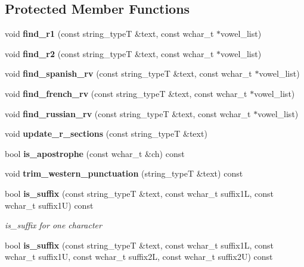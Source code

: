 \subsection*{Protected Member Functions}
\begin{DoxyCompactItemize}
\item 
void {\bfseries find\+\_\+r1} (const string\+\_\+typeT \&text, const wchar\+\_\+t $\ast$vowel\+\_\+list)\label{classstemming_1_1stem_a364b7a76f683d5244715638069a4fa93}

\item 
void {\bfseries find\+\_\+r2} (const string\+\_\+typeT \&text, const wchar\+\_\+t $\ast$vowel\+\_\+list)\label{classstemming_1_1stem_ab381c0d6a6291c2c21515e9398e83085}

\item 
void {\bfseries find\+\_\+spanish\+\_\+rv} (const string\+\_\+typeT \&text, const wchar\+\_\+t $\ast$vowel\+\_\+list)\label{classstemming_1_1stem_ae6cb258098ba91462d421977b1eed8e7}

\item 
void {\bfseries find\+\_\+french\+\_\+rv} (const string\+\_\+typeT \&text, const wchar\+\_\+t $\ast$vowel\+\_\+list)\label{classstemming_1_1stem_a9626e49b982eda0d8ec3bb861d864b42}

\item 
void {\bfseries find\+\_\+russian\+\_\+rv} (const string\+\_\+typeT \&text, const wchar\+\_\+t $\ast$vowel\+\_\+list)\label{classstemming_1_1stem_a53dcfe6b18fe5b5882474f222190ef1b}

\item 
void {\bfseries update\+\_\+r\+\_\+sections} (const string\+\_\+typeT \&text)\label{classstemming_1_1stem_a9dcc3d89844ecd5c81eabf80936a0209}

\item 
bool {\bf is\+\_\+apostrophe} (const wchar\+\_\+t \&ch) const 
\item 
void {\bfseries trim\+\_\+western\+\_\+punctuation} (string\+\_\+typeT \&text) const \label{classstemming_1_1stem_a36818a956dd34c388fa9942ed46e28b4}

\item 
bool {\bf is\+\_\+suffix} (const string\+\_\+typeT \&text, const wchar\+\_\+t suffix1L, const wchar\+\_\+t suffix1U) const \label{classstemming_1_1stem_ac318ddd46a716673edf3678c47d3035c}

\begin{DoxyCompactList}\small\item\em is\+\_\+suffix for one character \end{DoxyCompactList}\item 
bool {\bf is\+\_\+suffix} (const string\+\_\+typeT \&text, const wchar\+\_\+t suffix1L, const wchar\+\_\+t suffix1U, const wchar\+\_\+t suffix2L, const wchar\+\_\+t suffix2U) const \label{classstemming_1_1stem_aad4dff424a3ae8a82dcfe6adac7c9d30}


\end{DoxyCompactItemize}
